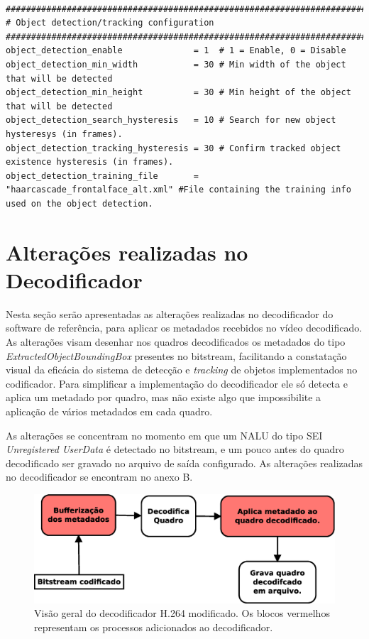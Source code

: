 \begin{lstlisting}

##########################################################################################
# Object detection/tracking configuration
##########################################################################################
object_detection_enable              = 1  # 1 = Enable, 0 = Disable
object_detection_min_width           = 30 # Min width of the object that will be detected
object_detection_min_height          = 30 # Min height of the object that will be detected
object_detection_search_hysteresis   = 10 # Search for new object hysteresys (in frames).
object_detection_tracking_hysteresis = 30 # Confirm tracked object existence hysteresis (in frames).
object_detection_training_file       = "haarcascade_frontalface_alt.xml" #File containing the training info used on the object detection.

\end{lstlisting}


\section{ Alterações realizadas no Decodificador }


Nesta seção serão apresentadas as alterações realizadas no decodificador do software de referência, para aplicar os metadados recebidos no vídeo decodificado. As alterações visam desenhar nos quadros decodificados os metadados do tipo \textit{ExtractedObjectBoundingBox} presentes no bitstream, facilitando a constatação visual da eficácia do sistema de detecção e \textit{tracking} de objetos implementados no codificador. Para simplificar a implementação do decodificador ele só detecta e aplica um metadado por quadro, mas não existe algo que impossibilite a aplicação de vários metadados em cada quadro.

As alterações se concentram no momento em que um NALU do tipo SEI \textit{Unregistered UserData} é detectado no bitstream, e um pouco antes do quadro decodificado ser gravado no arquivo de saída configurado. As alterações realizadas no decodificador se encontram no anexo B.

\begin{figure}[H]
\centering
\includegraphics[scale=0.5]{imagens/fig19.eps}
\caption{Visão geral do decodificador H.264 modificado. Os blocos vermelhos representam os processos adicionados ao decodificador.}
\label{fig:h264_moded_decoder}
\end{figure}


